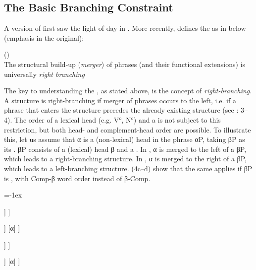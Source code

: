 \documentclass[output=paper, colorlinks, citecolor=brown]{langscibook}
\begin{document}
\subsection{The Basic Branching Constraint}\label{sec:sangfelt:2.1}

A version of  first saw the light of day in \citet{Haider1992}. More recently, \citet[3]{Haider2013} defines the  as in  below (emphasis in the original):

\ea
\label{ex:sangfelt:3}
 ()\\
The structural build-up (\textit{merger}) of phrases (and their functional extensions) is 
universally \textit{right branching}
\z 


The key to understanding the , as stated above, is the concept of \textit{right-branching}. A structure is right-branching if merger of phrases occurs to the left, i.e. if a phrase that enters the structure precedes the already existing structure (see \citealt{Haider2013}: 3–4). The order of a lexical head (e.g. V°, N°) and a  is not subject to this restriction, but both head- and complement-head order are possible. To illustrate this, let us assume that α is a (non-lexical) head in the phrase αP, taking βP as its . βP consists of a (lexical) head β and a . In , α is merged to the left of a  βP, which leads to a right-branching structure. In , α is merged to the right of a  βP, which leads to a left-branching structure. (4c–d) show that the same applies if βP is , with Comp-β word order instead of β{}-Comp.


\ea
\label{ex:sangfelt:4} 
\columnsep=-1ex
\begin{multicols}{4}
\ea \label{ex:sangfelt:4a}
\begin{forest}
	[αP
		 [α]
		  [βP 
		  	 [β] 
		  	 [Comp]
  	 	 ]
	 ]
\end{forest}

\ex\label{ex:sangfelt:4b} 
\begin{forest}
	[αP 
		[βP 
			[β] 
			[Comp]
			]
		[α] 
	]	
\end{forest}

\ex \label{ex:sangfelt:4c} 
\begin{forest}
	[αP
		[α]
		[βP
			[Comp] 
			[β]
		]
	]
\end{forest}

\ex \label{ex:sangfelt:4d} 
\begin{forest}
		[αP
			[βP
				[Comp]
				[β]
			]
			[α]
		]
\end{forest}

\z 
\end{multicols}
\z
\end{document}
